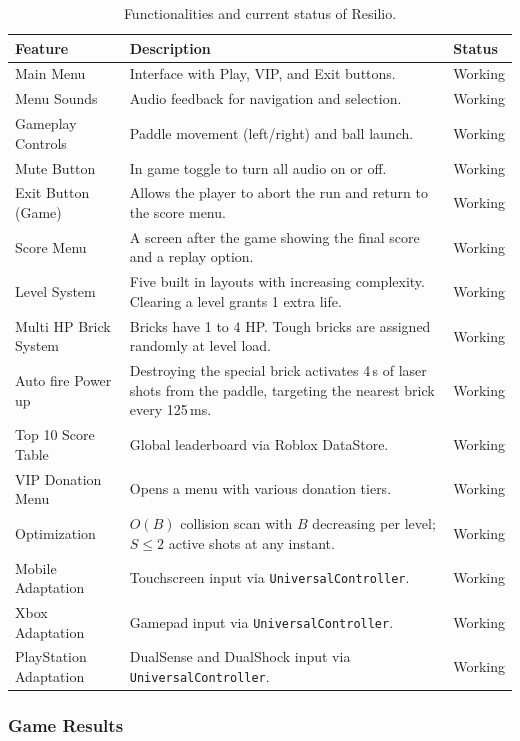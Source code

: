 \documentclass[12pt,letterpaper]{article}
\begin{document}
\begin{table}[H]
\centering
\begin{tabular}{|p{4cm}|p{8cm}|p{2.5cm}|}
\hline
\textbf{Feature} & \textbf{Description} & \textbf{Status} \\
\hline
Main Menu & Interface with Play, VIP, and Exit buttons. & Working \\
\hline
Menu Sounds & Audio feedback for navigation and selection. & Working \\
\hline
Gameplay Controls & Paddle movement (left/right) and ball launch. & Working \\
\hline
Mute Button & In game toggle to turn all audio on or off. & Working \\
\hline
Exit Button (Game) & Allows the player to abort the run and return to the score menu. & Working \\
\hline
Score Menu & A screen after the game showing the final score and a replay option. & Working \\
\hline
Level System & Five built in layouts with increasing complexity. Clearing a level grants 1 extra life. & Working \\
\hline
Multi HP Brick System & Bricks have 1 to 4 HP. Tough bricks are assigned randomly at level load. & Working \\
\hline
Auto fire Power up & Destroying the special brick activates 4\,s of laser shots from the paddle, targeting the nearest brick every 125\,ms. & Working \\
\hline
Top 10 Score Table & Global leaderboard via Roblox DataStore. & Working \\
\hline
VIP Donation Menu & Opens a menu with various donation tiers. & Working \\
\hline
Optimization & $O(B)$ collision scan with $B$ decreasing per level; $S \leq 2$ active shots at any instant. & Working \\
\hline
Mobile Adaptation & Touchscreen input via \texttt{UniversalController}. & Working \\
\hline
Xbox Adaptation & Gamepad input via \texttt{UniversalController}. & Working \\
\hline
PlayStation Adaptation & DualSense and DualShock input via \texttt{UniversalController}. & Working \\
\hline
\end{tabular}
\caption{Functionalities and current status of Resilio.}
\end{table}

\subsubsection{Game Results}
\end{document}
